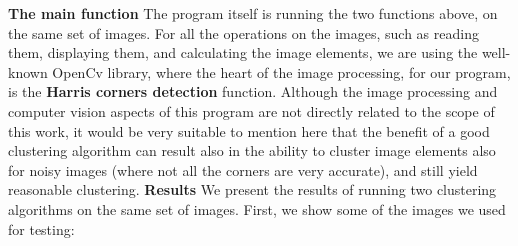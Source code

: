 \documentclass[12pt]{article}
\begin{document}
\textbf{The main function} \newline
The program itself is running the two functions above, on the same set of images. \newline
For all the operations on the images, such as reading them, displaying them, and calculating the image elements, we are using the well-known OpenCv library,
where the heart of the image processing, for our program, is the \textbf{Harris corners detection} function. \newline
Although the image processing and computer vision aspects of this program are not directly related to the scope of this work, it would be very suitable to mention here that the benefit of a good clustering algorithm can result also in the ability to cluster image elements also for noisy images (where not all the corners are very accurate), and still yield reasonable clustering.
\newpage
\textbf{Results} \newline
We present the results of running two clustering algorithms on the same set of images. First, we show some of the images we used for testing: \newline
\newline
\end{document}
